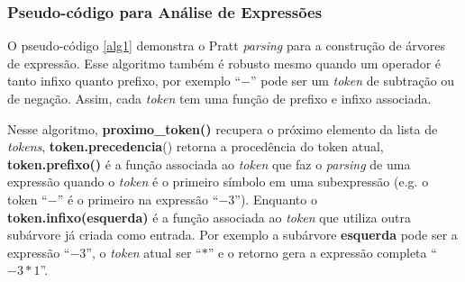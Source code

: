 \documentclass[english, 
               brazil, 
               bsc] %
               {dcomp-abntex2}
\begin{document}
%
%
%
%


\subsubsection{Pseudo-código para Análise de Expressões}


O pseudo-código \ref{alg1}
demonstra o Pratt \textit{parsing} para a construção de árvores de expressão. Esse algoritmo também é robusto mesmo quando um operador é tanto infixo quanto prefixo, por exemplo ``$-$'' pode ser um \textit{token} de subtração ou de negação. Assim, cada \textit{token} tem uma função de prefixo e infixo associada.


Nesse algoritmo, 
\textbf{proximo\_token()} recupera o próximo elemento da lista de \textit{tokens},
\textbf{token.precedencia}() retorna a procedência do token atual, \textbf{token.prefixo()} é a função associada ao \textit{token} que faz o \textit{parsing} de uma expressão quando o \textit{token} é o primeiro símbolo em uma subexpressão (e.g. o token ``$-$'' é o primeiro na expressão ``$-3$''). Enquanto o \textbf{token.infixo(esquerda)} é a função associada ao \textit{token} que utiliza outra subárvore já criada como entrada. Por exemplo a subárvore \textbf{esquerda} pode ser a expressão ``$-3$'', o \textit{token} atual ser ``$*$'' e o retorno gera a expressão completa ``$-3 * 1$''.
\end{document}
